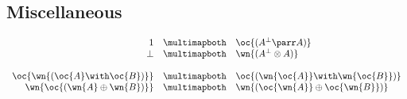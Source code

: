 \subsection{Miscellaneous}

\(\begin{array}{rcl}
  \one & \linequiv&  \oc{(A\orth\parr A)} \\
  \bot & \linequiv&  \wn{(A\orth\tens A)} \\
\\
  \oc{\wn{(\oc{A}\with\oc{B})}} & \linequiv&  \oc{(\wn{\oc{A}}\with\wn{\oc{B}})} \\
  \wn{\oc{(\wn{A}\plus\wn{B})}} & \linequiv&  \wn{(\oc{\wn{A}}\plus\oc{\wn{B}})}
\end{array}\)


